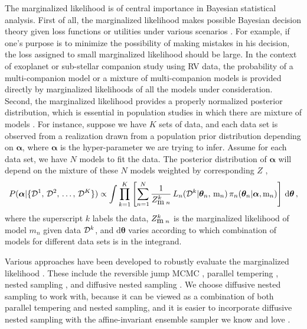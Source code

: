 \documentclass[letterpaper, preprint]{aastex}
\newcommand{\bth} {\boldsymbol \theta}
\newcommand{\bal} {\boldsymbol \alpha}
\newcommand{\md}{\mathrm{d}}
\begin{document}
The marginalized likelihood is of central importance in Bayesian statistical analysis. First of all, the marginalized likelihood makes possible Bayesian decision theory given loss functions or utilities under various scenarios \citep{kass95a, jaynes03a}. For example, if one's purpose is to minimize the possibility of making mistakes in his decision, the loss assigned to small marginalized likelihood should be large. In the context of exoplanet or sub-stellar companion study using RV data, the probability of a multi-companion model or a mixture of multi-companion models is provided directly by marginalized likelihoods of all the models under consideration. Second, the marginalized likelihood provides a properly normalized posterior distribution, which is essential in population studies in which there are mixture of models \citep{richardson97a, gelman04a}. For instance, suppose we have $K$ sets of data, and each data set is observed from a realization drawn from a population prior distribution depending on $\bal$, where $\bal$ is the hyper-parameter we are trying to infer. Assume for each data set, we have $N$ models to fit the data. The posterior distribution of $\bal$ will depend on the mixture of these $N$ models weighted by corresponding $Z$ \citep{hogg10a},
\begin{equation}
P(\bal | \{ {\cal D}^1,\, {\cal D}^2,\,\ldots,\, {\cal D}^K \}) \propto \int \prod_{k=1}^K\left[ \sum_{n=1}^{N} \frac{1}{Z_{ {\mbox m}\;n}^k}\,L_n({\cal D}^k| \bth_n,\, {\mbox m}_n )\,\pi_n(\bth_n | \bal, {\mbox m}_n) \right]\,\md\bth\, ,
\label{eq:model-mixture}
\end{equation}
where the superscript $k$ labels the data, $Z_{ {\mbox m}\;n}^k$ is the marginalized likelihood of model $m_n$ given data ${\cal D}^k$, and $\md\bth$ varies according to which combination of models for different data sets is in the integrand.

Various approaches have been developed to robustly evaluate the marginalized likelihood \citep{cameron13a}. These include the reversible jump MCMC \citep{richardson97a}, parallel tempering \citep{ford07a}, nested sampling \citep{skilling06a, feroz08a}, and diffusive nested sampling \citep{brewer11a}. We choose diffusive nested sampling to work with, because it can be viewed as a combination of both parallel tempering and nested sampling, and it is easier to incorporate diffusive nested sampling with the affine-invariant ensemble sampler we know and love \citep{goodman10a, hou12a, foreman-mackey13a}.
\end{document}
